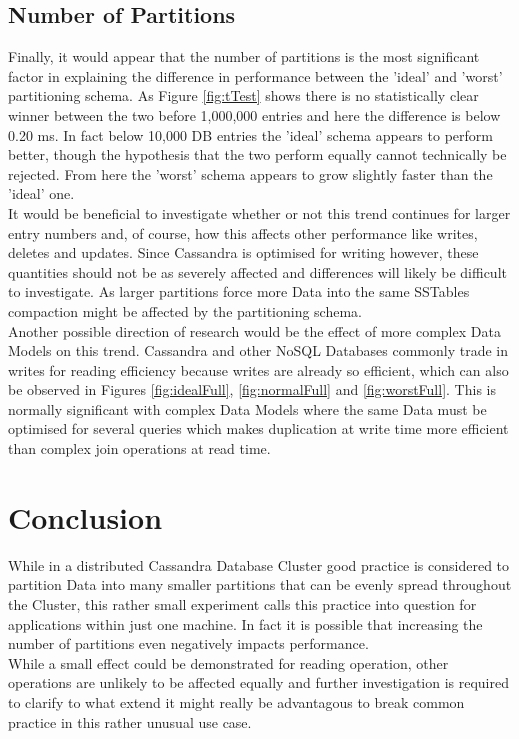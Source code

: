 \documentclass{template/csfourzero}
\begin{document}
  \subsection{Number of Partitions}
  Finally, it would appear that the number of partitions is the most significant factor in explaining the difference in performance between the 'ideal' and 'worst' partitioning schema. As Figure \ref{fig:tTest} shows there is no statistically clear winner between the two before 1,000,000 entries and here the difference is below 0.20 ms. In fact below 10,000 DB entries the 'ideal' schema appears to perform better, though the hypothesis that the two perform equally cannot technically be rejected. From here the 'worst' schema appears to grow slightly faster than the 'ideal' one.
  \\
  It would be beneficial to investigate whether or not this trend continues for larger entry numbers and, of course, how this affects other performance like writes, deletes and updates. Since Cassandra is optimised for writing however, these quantities should not be as severely affected and differences will likely be difficult to investigate. \cite{ctoAnalysis,cassandraBasics,cassandraKey} As larger partitions force more Data into the same SSTables compaction might be affected by the partitioning schema.
  \\
  Another possible direction of research would be the effect of more complex Data Models on this trend. Cassandra and other NoSQL Databases commonly trade in writes for reading efficiency because writes are already so efficient, which can also be observed in Figures \ref{fig:idealFull}, \ref{fig:normalFull} and \ref{fig:worstFull}. This is normally significant with complex Data Models where the same Data must be optimised for several queries which makes duplication at write time more efficient than complex join operations at read time. \cite{cassandraBasics,sherman}
  
  

\section{Conclusion} %
\label{sec:conc}

  While in a distributed Cassandra Database Cluster good practice is considered to partition Data into many smaller partitions that can be evenly spread throughout the Cluster, this rather small experiment calls this practice into question for applications within just one machine. In fact it is possible that increasing the number of partitions even negatively impacts performance. 
  \\
  While a small effect could be demonstrated for reading operation, other operations are unlikely to be affected equally and further investigation is required to clarify to what extend it might really be advantagous to break common practice in this rather unusual use case.


\clearpage

\end{document}
